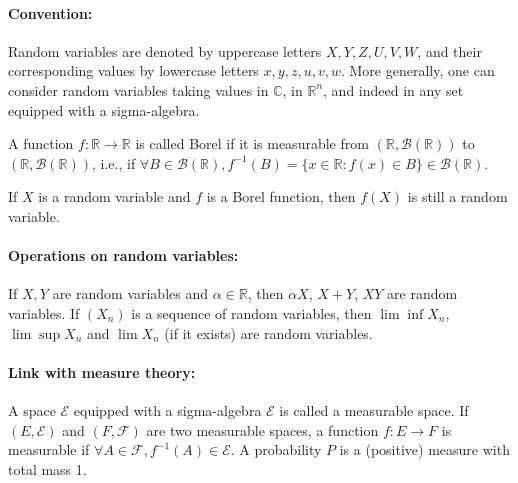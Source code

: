\paragraph{Convention:} Random variables are denoted by uppercase letters $X, Y, Z, U, V, W$, and their corresponding values by lowercase letters $x, y, z, u, v, w$.
More generally, one can consider random variables taking values in $\mathbb{C}$, in $\mathbb{R}^n$, and indeed in any set equipped with a sigma-algebra.%
\begin{definition}
A function $f : \mathbb{R} \to \mathbb{R}$ is called Borel if it is measurable from $(\mathbb{R}, \mathcal{B}(\mathbb{R}))$ to $(\mathbb{R}, \mathcal{B}(\mathbb{R}))$, i.e., if $\forall B \in \mathcal{B}(\mathbb{R}), f^{-1}(B) = \{x \in \mathbb{R} : f(x) \in B\} \in \mathcal{B}(\mathbb{R})$.
\end{definition}%
\begin{example}
If $X$ is a random variable and $f$ is a Borel function, then $f(X)$ is still a random variable.
\end{example}%
\paragraph{Operations on random variables:}
If $X, Y$ are random variables and $\alpha \in \mathbb{R}$, then $\alpha X$, $X+Y$, $XY$ are random variables.
If $(X_n)$ is a sequence of random variables, then $\lim\inf X_n$, $\lim\sup X_n$ and $\lim X_n$ (if it exists) are random variables.
\paragraph{Link with measure theory:}
A space $\mathcal{E}$ equipped with a sigma-algebra $\mathcal{E}$ is called a measurable space. If $(E, \mathcal{E})$ and $(F, \mathcal{F})$ are two measurable spaces, a function $f: E \to F$ is measurable if $\forall A \in \mathcal{F}, f^{-1}(A) \in \mathcal{E}$. A probability $P$ is a (positive) measure with total mass 1.%
